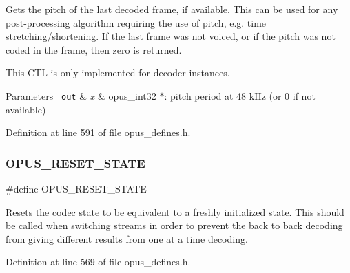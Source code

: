 Gets the pitch of the last decoded frame, if available. This can be used for any post-\/processing algorithm requiring the use of pitch, e.\+g. time stretching/shortening. If the last frame was not voiced, or if the pitch was not coded in the frame, then zero is returned.

This C\+TL is only implemented for decoder instances.


\begin{DoxyParams}[1]{Parameters}
\mbox{\texttt{ out}}  & {\em x} & {\ttfamily opus\+\_\+int32 $\ast$}\+: pitch period at 48 k\+Hz (or 0 if not available) \\
\hline
\end{DoxyParams}


Definition at line 591 of file opus\+\_\+defines.\+h.

\mbox{\label{group__opus__genericctls_gadc74e4fa8bcdf9994187d52d92207337}} 
\subsubsection{\texorpdfstring{OPUS\_RESET\_STATE}{OPUS\_RESET\_STATE}}
{\footnotesize\ttfamily \#define O\+P\+U\+S\+\_\+\+R\+E\+S\+E\+T\+\_\+\+S\+T\+A\+TE}

Resets the codec state to be equivalent to a freshly initialized state. This should be called when switching streams in order to prevent the back to back decoding from giving different results from one at a time decoding. 

Definition at line 569 of file opus\+\_\+defines.\+h.

